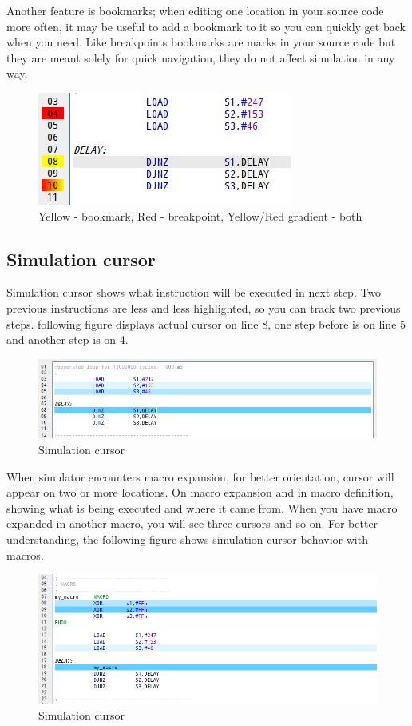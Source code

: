        Another feature is bookmarks; when editing one location in your source code more often, it may be useful to add
        a bookmark to it so you can quickly get back when you need. Like breakpoints bookmarks are marks in your source
        code but they are meant solely for quick navigation, they do not affect simulation in any way.

        \begin{figure}[h!]
            \centering
            \includegraphics[width=.4\textwidth]{img/breakpoints1.png}
            \caption{Yellow - bookmark, Red - breakpoint, Yellow/Red gradient - both}
        \end{figure}

    \subsection{Simulation cursor}
        Simulation cursor shows what instruction will be executed in next step. Two previous instructions are less and
        less highlighted, so you can track two previous steps. following figure displays actual cursor on line 8, one
        step before is on line 5 and another step is on 4.
        \begin{figure}[h!]
            \centering
            \includegraphics[width=\textwidth]{img/simulationcursor1.png}
            \caption{Simulation cursor}
        \end{figure}

        When simulator encounters macro expansion, for better orientation, cursor will appear on two or more locations.
        On macro expansion and in macro definition, showing what is being executed and where it came from. When you have
        macro expanded in another macro, you will see three cursors and so on. For better understanding, the following
        figure shows simulation cursor behavior with macros.
        \begin{figure}[h!]
            \centering
            \includegraphics[width=\textwidth]{img/simulationcursor2.png}
            \caption{Simulation cursor}
        \end{figure}

